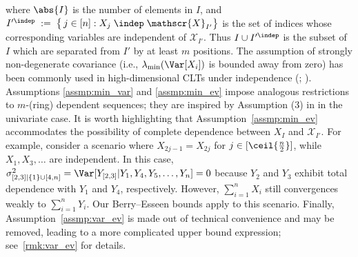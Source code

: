 \documentclass[aos]{imsart}
\begin{document}
where $\abs{I}$ is the number of elements in $I$, and $I'^{\indep} \;:=\; \bigl\{\,j \in [n] : X_j \;\indep\; \mathscr{X}_{I'}\bigr\}$ is the set of indices whose corresponding variables are independent of $\mathscr{X}_{I'}$. Thus $I \cup I'^{\indep}$ is the subset of $I$ which are separated from $I'$ by at least $m$ positions. 
The assumption of strongly non-degenerate covariance (i.e., $\lambda_{\min}(\Var[X_i])$ is bounded away from zero) has been commonly used in high-dimensional CLTs under independence (\citealp{kuchibhotla2020high,fang2021high,lopes2022central}; ). Assumptions \eqref{assmp:min_var} and \eqref{assmp:min_ev} impose analogous restrictions to $m$-(ring) dependent sequences; they are inspired by Assumption (3) in \citet{shergin1980convergence} in the univariate case. %
It is worth highlighting that Assumption~\eqref{assmp:min_ev} accommodates the possibility of complete dependence between $X_{I}$ and $\mathscr{X}_{I'}$. %
For example, consider a scenario where $X_{2j-1} = X_{2j}$ for $j \in [\ceil{\frac{n}{2}}]$, while $X_1, X_3, \dots$ are independent. In this case, $\sigma^2_{[2,3]|\{1\}\cup[4,n]} = \Var[Y_{[2,3]} | Y_1, Y_4, Y_5, \dots, Y_n] = 0$ because $Y_2$ and $Y_3$ exhibit total dependence with $Y_1$ and $Y_4$, respectively. However,  $\sum_{i=1}^n X_i$ still  convergences weakly to $\sum_{i=1}^n Y_i$. Our Berry--Esseen bounds apply to this scenario.
Finally, Assumption~\eqref{assmp:var_ev} is made out of technical convenience and may be removed, leading to a more complicated upper bound expression; see~\cref{rmk:var_ev} for details.
\end{document}
